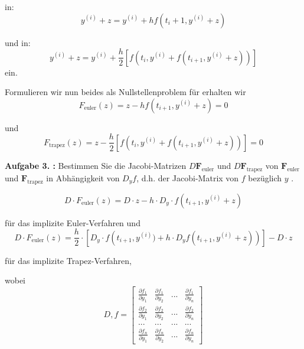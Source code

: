 in:
\begin{equation}
	 y^{(i)}+ z = y^{(i)} + hf\left(t_i+1,y^{(i)} + z\right) 
\end{equation}



und in:
\begin{equation}
	 y^{(i)} + z = y^{(i)} + \frac{h}{2} \left[f\left(t_i, y^{(i)} + f\left(t_{i+1},y^{(i)} + z\right)\right)\right] 
\end{equation}
ein.

Formulieren wir nun beides als Nullstellenproblem für  erhalten wir
\begin{equation}
	 F_{\mathrm{euler}}(z) = z - hf(t_{i+1}, y^{(i)} + z) = 0 
\end{equation}

und 
\begin{equation}
F_{\mathrm{trapez}}(z) =  z - \frac{h}{2} \left[f\left(t_i, y^{(i)} + f(t _{i+1},y^{(i)} + z)\right)\right] = 0
\end{equation}

\begin{mybox}
\textbf{Aufgabe 3. :}
Bestimmen Sie die Jacobi-Matrizen $D\textbf{F}_{\mathrm{euler}}$ und $D\textbf{F}_{\mathrm{trapez}}$ von $\textbf{F}_{\mathrm{euler}}$  und $\textbf{F}_{\mathrm{trapez}}$  in Abhängigkeit von $D_yf$, d.h. der Jacobi-Matrix von $f$ bezüglich $y$ .
\end{mybox}

\begin{equation}
	 D\cdot F_{\mathrm{euler}}(z) = D\cdot z - h\cdot D_y\cdot f\left(t_{i+1}, y^{(i)} + z\right) 
\end{equation}


für das implizite Euler-Verfahren und
\begin{equation}
	 D\cdot F_{\mathrm{euler}}(z) = \frac{h}{2}\cdot \left[D_{y}\cdot f\left(t_{i+1}, y^{(i)}) +  h\cdot D_y f(t_{i+1}, y^{(i)} + z)\right)\right] - D\cdot z 
\end{equation}


für das implizite Trapez-Verfahren,

wobei 
\begin{equation}
	D, f =
\begin{bmatrix}
	\frac{\partial f_1 }{\partial y_1} & \frac{\partial f_1 }{\partial y_2} & ... & \frac{\partial f_1 }{\partial y_n} \\
	\frac{\partial f_2 }{\partial y_1} & \frac{\partial f_2 }{\partial y_2} & ... & \frac{\partial f_2 }{\partial y_n} \\
	... & ... & ... & ... \\
	\frac{\partial f_n }{\partial y_1} & \frac{\partial f_n }{\partial y_2} & ... & \frac{\partial f_n }{\partial y_n} 
\end{bmatrix} 
\end{equation}


